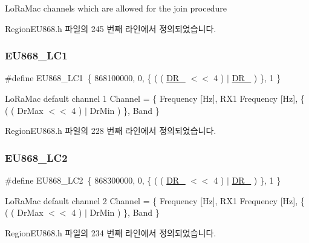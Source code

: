Lo\+Ra\+Mac channels which are allowed for the join procedure 

Region\+E\+U868.\+h 파일의 245 번째 라인에서 정의되었습니다.

\mbox{\label{group___r_e_g_i_o_n_e_u868_ga397b82ce41a0eb594465b5728586d76e}} 
\subsubsection{\texorpdfstring{E\+U868\+\_\+\+L\+C1}{EU868\_LC1}}
{\footnotesize\ttfamily \#define E\+U868\+\_\+\+L\+C1~\{ 868100000, 0, \{ ( ( \mbox{\hyperlink{group___r_e_g_i_o_n_ga872e12c82020c02a7f70a1c6ed1375df}{D\+R\+\_}} $<$$<$ 4 ) $\vert$ \mbox{\hyperlink{group___r_e_g_i_o_n_ga6c4ef966b4f3d5eb7597b087f2b97095}{D\+R\+\_}} ) \}, 1 \}}

Lo\+Ra\+Mac default channel 1 Channel = \{ Frequency \mbox{[}Hz\mbox{]}, R\+X1 Frequency \mbox{[}Hz\mbox{]}, \{ ( ( Dr\+Max $<$$<$ 4 ) $\vert$ Dr\+Min ) \}, Band \} 

Region\+E\+U868.\+h 파일의 228 번째 라인에서 정의되었습니다.

\mbox{\label{group___r_e_g_i_o_n_e_u868_ga992597dafaae7a354ae4aeaab6306954}} 
\subsubsection{\texorpdfstring{E\+U868\+\_\+\+L\+C2}{EU868\_LC2}}
{\footnotesize\ttfamily \#define E\+U868\+\_\+\+L\+C2~\{ 868300000, 0, \{ ( ( \mbox{\hyperlink{group___r_e_g_i_o_n_ga872e12c82020c02a7f70a1c6ed1375df}{D\+R\+\_}} $<$$<$ 4 ) $\vert$ \mbox{\hyperlink{group___r_e_g_i_o_n_ga6c4ef966b4f3d5eb7597b087f2b97095}{D\+R\+\_}} ) \}, 1 \}}

Lo\+Ra\+Mac default channel 2 Channel = \{ Frequency \mbox{[}Hz\mbox{]}, R\+X1 Frequency \mbox{[}Hz\mbox{]}, \{ ( ( Dr\+Max $<$$<$ 4 ) $\vert$ Dr\+Min ) \}, Band \} 

Region\+E\+U868.\+h 파일의 234 번째 라인에서 정의되었습니다.

\mbox{\label{group___r_e_g_i_o_n_e_u868_ga6feb4643d2e07e54de83109e680379d2}} 
